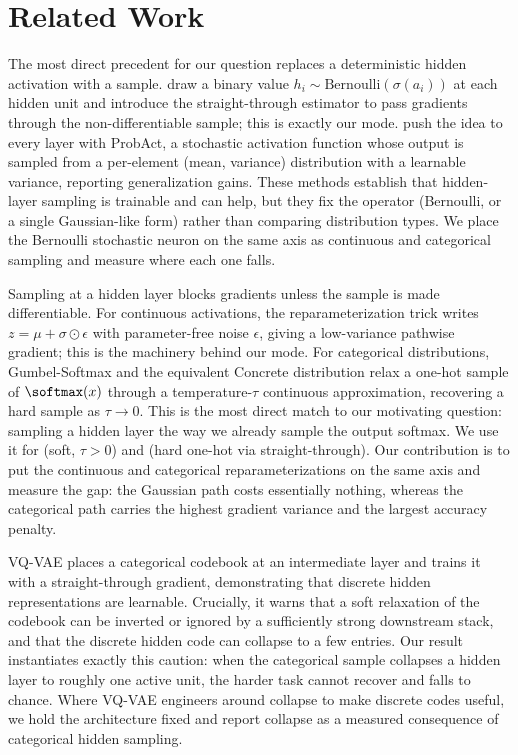 \section{Related Work}\label{sec:related}

 The most direct precedent for our question replaces a deterministic hidden activation with a sample. \citet{bengio2013stochastic} draw a binary value $h_i \sim \mathrm{Bernoulli}(\sigma(a_i))$ at each hidden unit and introduce the straight-through estimator to pass gradients through the non-differentiable sample; this is exactly our \bernoullist{} mode. \citet{lee2019probact} push the idea to every layer with ProbAct, a stochastic activation function whose output is sampled from a per-element (mean, variance) distribution with a learnable variance, reporting generalization gains. These methods establish that hidden-layer sampling is trainable and can help, but they fix the operator (Bernoulli, or a single Gaussian-like form) rather than comparing distribution types. We place the Bernoulli stochastic neuron on the same axis as continuous and categorical sampling and measure where each one falls.

 Sampling at a hidden layer blocks gradients unless the sample is made differentiable. For continuous activations, the reparameterization trick \citep{kingma2014vae,rezende2014stochastic} writes $z = \mu + \sigma \odot \epsilon$ with parameter-free noise $\epsilon$, giving a low-variance pathwise gradient; this is the machinery behind our \gaussreparam{} mode. For categorical distributions, Gumbel-Softmax and the equivalent Concrete distribution \citep{jang2017gumbel,maddison2017concrete} relax a one-hot sample of $\softmax(x)$ through a temperature-$\tau$ continuous approximation, recovering a hard sample as $\tau \to 0$. This is the most direct match to our motivating question: sampling a hidden layer the way we already sample the output softmax. We use it for \gumbelsoft{} (soft, $\tau>0$) and \gumbelst{} (hard one-hot via straight-through). Our contribution is to put the continuous and categorical reparameterizations on the same axis and measure the gap: the Gaussian path costs essentially nothing, whereas the categorical path carries the highest gradient variance and the largest accuracy penalty.

 VQ-VAE \citep{oord2017vqvae} places a categorical codebook at an intermediate layer and trains it with a straight-through gradient, demonstrating that discrete hidden representations are learnable. Crucially, it warns that a soft relaxation of the codebook can be inverted or ignored by a sufficiently strong downstream stack, and that the discrete hidden code can collapse to a few entries. Our \cifar{} result instantiates exactly this caution: when the categorical sample collapses a hidden layer to roughly one active unit, the harder task cannot recover and \gumbelst{} falls to chance. Where VQ-VAE engineers around collapse to make discrete codes useful, we hold the architecture fixed and report collapse as a measured consequence of categorical hidden sampling.

